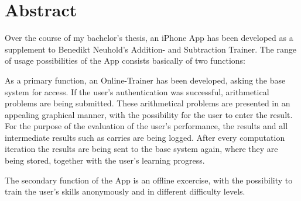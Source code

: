 

\chapter*{Abstract}
\label{cha:abstract_en}

Over the course of my bachelor's thesis, an iPhone App has been developed as a
supplement to Benedikt Neuhold's Addition- and Subtraction Trainer.
The range of usage possibilities of the App consists basically of two functions:

As a primary function, an Online-Trainer has been developed, asking the base 
system for access. If the user's authentication was successful, arithmetical problems
are being submitted.
These arithmetical problems are presented in an appealing graphical manner, with 
the possibility for the user to enter the result.
For the purpose of the evaluation of the user's performance, the results and all
intermediate results such as carries are being logged. After every computation iteration
the results are being sent to the base system again, where they are being stored, 
together with the user's learning progress.

The secondary function of the App is an offline excercise, with the
possibility to train the user's skills anonymously and in different difficulty 
levels.





